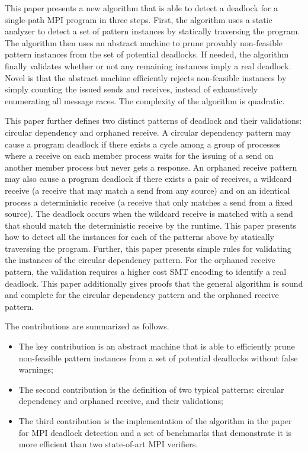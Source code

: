 This paper presents a new algorithm that is able to detect a deadlock for a single-path MPI program in three steps. First, the algorithm uses a static analyzer to detect a set of pattern instances by statically traversing the program. The algorithm then uses an abstract machine to prune provably non-feasible pattern instances from the set of potential deadlocks. If needed, the algorithm finally validates whether or not any remaining instances imply a real deadlock. Novel is that the abstract machine efficiently rejects non-feasible instances by simply counting the issued sends and receives, instead of exhaustively enumerating all message races. The complexity of the algorithm is quadratic. 

This paper further defines two distinct patterns of deadlock and their validations: circular dependency and orphaned receive. A circular dependency pattern may cause a program deadlock if there exists a cycle among a group of processes where a receive on each member process waits for the issuing of a send on another member process but never gets a response. An orphaned receive pattern may also cause a program deadlock if there exists a pair of receives, a wildcard receive (a receive that may match a send from any source) and on an identical process a deterministic receive (a receive that only matches a send from a fixed source). The deadlock occurs when the wildcard receive is matched with a send that should match the deterministic receive by the runtime. This paper presents how to detect all the instances for each of the patterns above by statically traversing the program. Further, this paper presents simple rules for validating the instances of the circular dependency pattern. For the orphaned receive pattern, the validation requires a higher cost SMT encoding to identify a real deadlock. 
This paper additionally gives proofs that the general algorithm is sound and complete for the circular dependency pattern and the orphaned receive pattern. 


The contributions are summarized as follows.
\begin{itemize}
\item The key contribution is an abstract machine that is able to efficiently prune non-feasible pattern instances from a set of potential deadlocks without false warnings; 
\item The second contribution is the definition of two typical patterns: circular dependency and orphaned receive, and their validations;
\item The third contribution is the implementation of the algorithm in the paper for MPI deadlock detection and a set of benchmarks that demonstrate it is more efficient than two state-of-art MPI verifiers.
\end{itemize}

